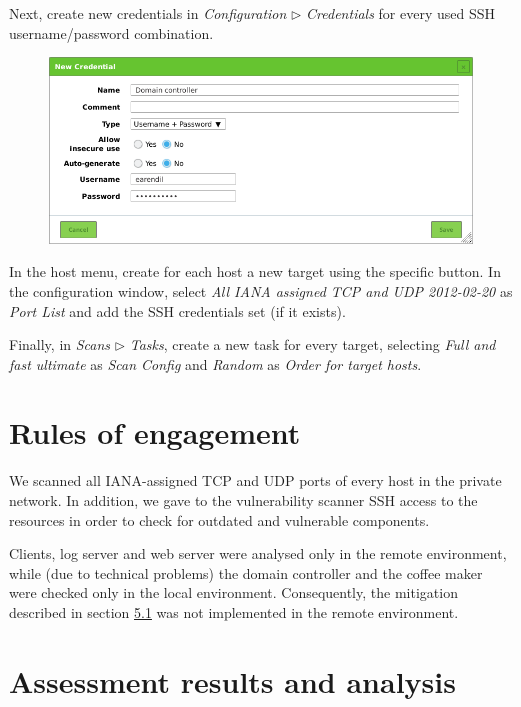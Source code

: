 \documentclass[draft]{homework}
\begin{document}
    Next, create new credentials in \textit{Configuration} $\triangleright$ \textit{Credentials} for every used SSH username/password combination.
    \vspace{-5pt}
    \begin{figure}[H]
        \centering
        \includegraphics[width=1\linewidth]{images/new-credentials}
        \label{fig:new-credentials}
    \end{figure}
    \vspace{-20pt}
    
    In the host menu, create for each host a new target using the specific button.
    In the configuration window, select \textit{All IANA assigned TCP and UDP 2012-02-20} as \textit{Port List} and add the SSH credentials set (if it exists).
    
    Finally, in \textit{Scans} $\triangleright$ \textit{Tasks}, create a new task for every target, selecting \textit{Full and fast ultimate} as \textit{Scan Config} and \textit{Random} as \textit{Order for target hosts}.
    
    
    \section{Rules of engagement}
    We scanned all IANA-assigned TCP and UDP ports of every host in the private network.
    In addition, we gave to the vulnerability scanner SSH access to the resources in order to check for outdated and vulnerable components.
    
    Clients, log server and web server were analysed only in the remote environment, while (due to technical problems) the domain controller and the coffee maker were checked only in the local environment.
    Consequently, the mitigation described in section \hyperref[sec:http-mitigation]{5.1} was not implemented in the remote environment.
    
    
    \section{Assessment results and analysis}
\end{document}
